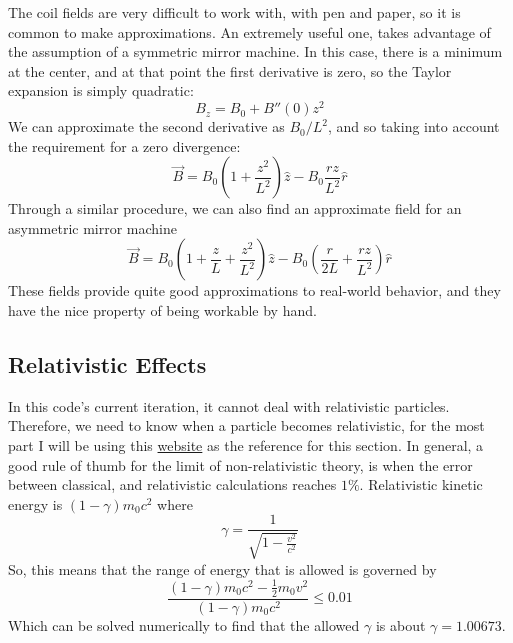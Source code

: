\documentclass[12pt]{article}
\begin{document}
The coil fields are very difficult to work with, with pen and paper, so it is common to make approximations. An extremely useful one, takes advantage of the assumption of  a symmetric mirror machine. In this case, there is a minimum at the center, and at that point the first derivative is zero, so the Taylor expansion is simply quadratic:
$$B_z=B_0+B''(0)z^2$$
We can approximate the second derivative as $B_0/L^2$, and so taking into account the requirement for a zero divergence:
\begin{equation}\label{taylorsymB}
\vec{B}=B_0\left(1+\frac{z^2}{L^2}\right)\hat{z}-B_0\frac{rz}{L^2}\hat{r}
\end{equation}
Through a similar procedure, we can also find an approximate field for an asymmetric mirror machine
\begin{equation}\label{taylorasymB}
\vec{B}=B_0\left(1+\frac{z}{L}+\frac{z^2}{L^2}\right)\hat{z}-B_0\left(\frac{r}{2L}+\frac{rz}{L^2}\right)\hat{r}
\end{equation} 
These fields provide quite good approximations to real-world behavior, and they have the nice property of being workable by hand.
\subsection{Relativistic Effects}
In this code's current iteration, it cannot deal with relativistic particles. Therefore, we need to know when a particle becomes relativistic, for the most part I will be using this \href{http://hyperphysics.phy-astr.gsu.edu/hbase/Relativ/rellim.html}{website} as the reference for this section. In general, a good rule of thumb for the limit of non-relativistic theory, is when the error between classical, and relativistic calculations reaches $1\%$. Relativistic kinetic energy is $(1-\gamma)m_0c^2$ where 
\begin{equation}\label{gamma}
\gamma=\frac{1}{\sqrt{1-\frac{v^2}{c^2}}}
\end{equation}
So, this means that the range of energy that is allowed is governed by
\begin{equation}\label{energyrange}
\frac{(1-\gamma)m_0c^2-\frac{1}{2}m_0v^2}{(1-\gamma)m_0c^2}\leq 0.01
\end{equation} 
Which can be solved numerically to find that the allowed $\gamma$ is about $\gamma=1.00673$.
\end{document}
